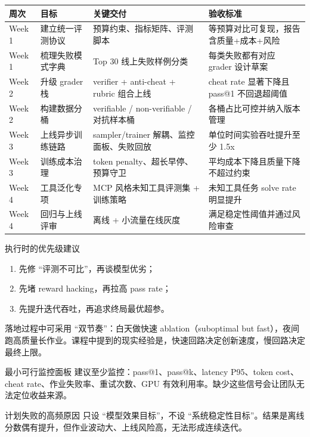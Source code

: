 \documentclass[a4paper]{article}
\begin{document}
\begin{longtable}{p{1.3cm}p{3.0cm}p{2.7cm}p{3.5cm}}
\toprule
\textbf{周次} & \textbf{目标} & \textbf{关键交付} & \textbf{验收标准} \\
\midrule
Week 1 & 建立统一评测协议 & 预算约束、指标矩阵、评测脚本 & 等预算对比可复现，报告含质量+成本+风险 \\
Week 1 & 梳理失败模式字典 & Top 30 线上失败样例分类 & 每类失败都有对应 grader 设计草案 \\
Week 2 & 升级 grader 栈 & verifier + anti-cheat + rubric 组合上线 & cheat rate 显著下降且 pass@1 不回退超阈值 \\
Week 2 & 构建数据分桶 & verifiable / non-verifiable / 对抗样本桶 & 各桶占比可控并纳入版本管理 \\
Week 3 & 上线异步训练链路 & sampler/trainer 解耦、监控面板、失败回放 & 单位时间实验吞吐提升至少 1.5x \\
Week 3 & 训练成本治理 & token penalty、超长早停、预算守卫 & 平均成本下降且质量下降不超过约束 \\
Week 4 & 工具泛化专项 & MCP 风格未知工具评测集 + 训练策略 & 未知工具任务 solve rate 明显提升 \\
Week 4 & 回归与上线评审 & 离线 + 小流量在线灰度 & 满足稳定性阈值并通过风险审查 \\
\bottomrule
\end{longtable}

\begin{importantbox}{执行时的优先级建议}
\begin{enumerate}
    \item 先修 ``评测不可比''，再谈模型优劣；
    \item 先堵 reward hacking，再拉高 pass rate；
    \item 先提升迭代吞吐，再追求终局最优超参。
\end{enumerate}
\end{importantbox}

落地过程中可采用 ``双节奏''：白天做快速 ablation（suboptimal but fast），夜间跑高质量长作业。课程中提到的现实经验是，快速回路决定创新速度，慢回路决定最终上限。

\begin{knowledgebox}{最小可行监控面板}
建议至少监控：pass@1、pass@k、latency P95、token cost、cheat rate、作业失败率、重试次数、GPU 有效利用率。缺少这些信号会让团队无法定位收益来源。
\end{knowledgebox}

\begin{warningbox}{计划失败的高频原因}
只设 ``模型效果目标''，不设 ``系统稳定性目标''。结果是离线分数偶有提升，但作业波动大、上线风险高，无法形成连续迭代。
\end{warningbox}
\end{document}
